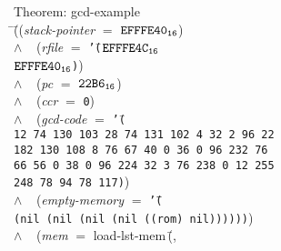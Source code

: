 \begin{tabbing}{\sc Theorem}:  gcd-example \\ 
\=\+(\=\+({\it{stack-pointer\/}} $=$ ${\tt{EFFFE40}_{16}}$) \\ 
$\wedge$$\;\;\;\;$({\it{rfile\/}} $=$ {\tt{'}}{\tt{(}}\=${\tt{EFFFE4C}_{16}}$ \\ 
${\tt{EFFFE40}_{16}}${\tt{)}}\-) \\ 
$\wedge$$\;\;\;\;$({\it{pc\/}} $=$ ${\tt{22B6}_{16}}$) \\ 
$\wedge$$\;\;\;\;$({\it{ccr\/}} $=$ {\tt{0}}) \\ 
$\wedge$$\;\;\;\;$({\it{gcd-code\/}} $=$ {\tt{'}}{\tt{(}}\= \\ 
{\tt{12}}{\tt{ }}{\tt{74}}{\tt{ }}{\tt{130}}{\tt{ }}{\tt{103}}{\tt{ }}{\tt{28}}{\tt{ }}{\tt{74}}{\tt{ }}{\tt{131}}{\tt{ }}{\tt{102}}{\tt{ }}{\tt{4}}{\tt{ }}{\tt{32}}{\tt{ }}{\tt{2}}{\tt{ }}{\tt{96}}{\tt{ }}{\tt{22}} \\ 
{\tt{182}}{\tt{ }}{\tt{130}}{\tt{ }}{\tt{108}}{\tt{ }}{\tt{8}}{\tt{ }}{\tt{76}}{\tt{ }}{\tt{67}}{\tt{ }}{\tt{40}}{\tt{ }}{\tt{0}}{\tt{ }}{\tt{36}}{\tt{ }}{\tt{0}}{\tt{ }}{\tt{96}}{\tt{ }}{\tt{232}}{\tt{ }}{\tt{76}} \\ 
{\tt{66}}{\tt{ }}{\tt{56}}{\tt{ }}{\tt{0}}{\tt{ }}{\tt{38}}{\tt{ }}{\tt{0}}{\tt{ }}{\tt{96}}{\tt{ }}{\tt{224}}{\tt{ }}{\tt{32}}{\tt{ }}{\tt{3}}{\tt{ }}{\tt{76}}{\tt{ }}{\tt{238}}{\tt{ }}{\tt{0}}{\tt{ }}{\tt{12}}{\tt{ }}{\tt{255}} \\ 
{\tt{248}}{\tt{ }}{\tt{78}}{\tt{ }}{\tt{94}}{\tt{ }}{\tt{78}}{\tt{ }}{\tt{117}}{\tt{)}}\-) \\ 
$\wedge$$\;\;\;\;$({\it{empty-memory\/}} $=$ {\tt{'}}{\tt{(}}\=\+{\tt{(}}\= \\ 
{\tt{(}}{\tt{nil}}{\tt{ }}{\tt{(}}{\tt{nil}}{\tt{ }}{\tt{(}}{\tt{nil}}{\tt{ }}{\tt{(}}{\tt{nil}}{\tt{ }}{\tt{(}}{\tt{(}}{\tt{rom}}{\tt{)}}{\tt{ }}{\tt{nil}}{\tt{)}}{\tt{)}}{\tt{)}}{\tt{)}}{\tt{)}}{\tt{)}}\-{\tt{)}}\-) \\ 
$\wedge$$\;\;\;\;$({\it{mem\/}} $=$ {\rm{load-lst-mem}}\,(\=, \\ 

\end{tabbing}
